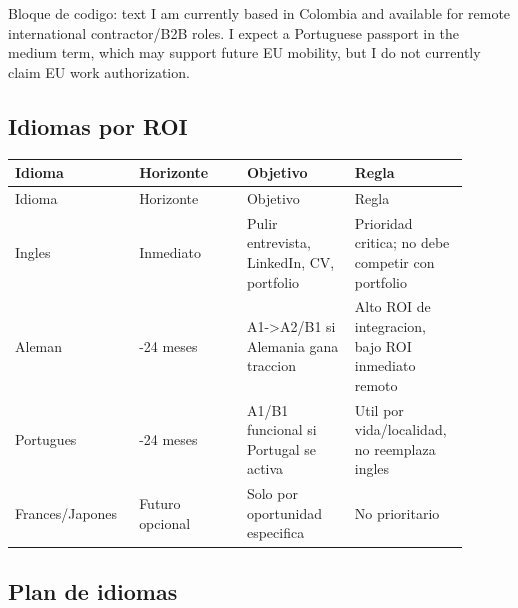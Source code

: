 \begin{mdcode}
Bloque de codigo: text
I am currently based in Colombia and available for remote international contractor/B2B roles. I expect a Portuguese passport in the medium term, which may support future EU mobility, but I do not currently claim EU work authorization.
\end{mdcode}


\subsection{Idiomas por ROI}


\begin{center}
\scriptsize
\begin{longtable}{>{\raggedright\arraybackslash}p{0.225\linewidth} >{\raggedright\arraybackslash}p{0.225\linewidth} >{\raggedright\arraybackslash}p{0.225\linewidth} >{\raggedright\arraybackslash}p{0.225\linewidth}}
\toprule
Idioma & Horizonte & Objetivo & Regla \\
\midrule
\endfirsthead
\toprule
Idioma & Horizonte & Objetivo & Regla \\
\midrule
\endhead
Ingles & Inmediato & Pulir entrevista, LinkedIn, CV, portfolio & Prioridad critica; no debe competir con portfolio \\
Aleman & 6-24 meses & A1->A2/B1 si Alemania gana traccion & Alto ROI de integracion, bajo ROI inmediato remoto \\
Portugues & 6-24 meses & A1/B1 funcional si Portugal se activa & Util por vida/localidad, no reemplaza ingles \\
Frances/Japones & Futuro opcional & Solo por oportunidad especifica & No prioritario \\
\bottomrule
\end{longtable}
\end{center}


\subsection{Plan de idiomas}


